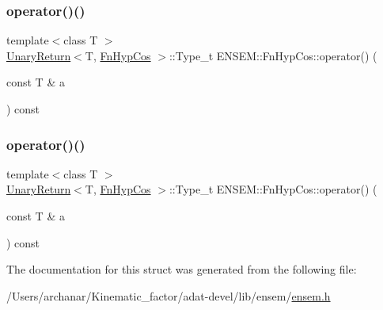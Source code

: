 \mbox{\label{structENSEM_1_1FnHypCos_abc3e4d24871bdf77186ed9f57adfcf1c}} 
\subsubsection{\texorpdfstring{operator()()}{operator()()}\hspace{0.1cm}{\footnotesize\ttfamily [2/3]}}
{\footnotesize\ttfamily template$<$class T $>$ \\
\mbox{\hyperlink{structENSEM_1_1UnaryReturn}{Unary\+Return}}$<$T, \mbox{\hyperlink{structENSEM_1_1FnHypCos}{Fn\+Hyp\+Cos}} $>$\+::Type\+\_\+t E\+N\+S\+E\+M\+::\+Fn\+Hyp\+Cos\+::operator() (\begin{DoxyParamCaption}\item[{const T \&}]{a }\end{DoxyParamCaption}) const\hspace{0.3cm}{\ttfamily [inline]}}

\mbox{\label{structENSEM_1_1FnHypCos_abc3e4d24871bdf77186ed9f57adfcf1c}} 
\subsubsection{\texorpdfstring{operator()()}{operator()()}\hspace{0.1cm}{\footnotesize\ttfamily [3/3]}}
{\footnotesize\ttfamily template$<$class T $>$ \\
\mbox{\hyperlink{structENSEM_1_1UnaryReturn}{Unary\+Return}}$<$T, \mbox{\hyperlink{structENSEM_1_1FnHypCos}{Fn\+Hyp\+Cos}} $>$\+::Type\+\_\+t E\+N\+S\+E\+M\+::\+Fn\+Hyp\+Cos\+::operator() (\begin{DoxyParamCaption}\item[{const T \&}]{a }\end{DoxyParamCaption}) const\hspace{0.3cm}{\ttfamily [inline]}}



The documentation for this struct was generated from the following file\+:\begin{DoxyCompactItemize}
\item 
/\+Users/archanar/\+Kinematic\+\_\+factor/adat-\/devel/lib/ensem/\mbox{\hyperlink{adat-devel_2lib_2ensem_2ensem_8h}{ensem.\+h}}\end{DoxyCompactItemize}
